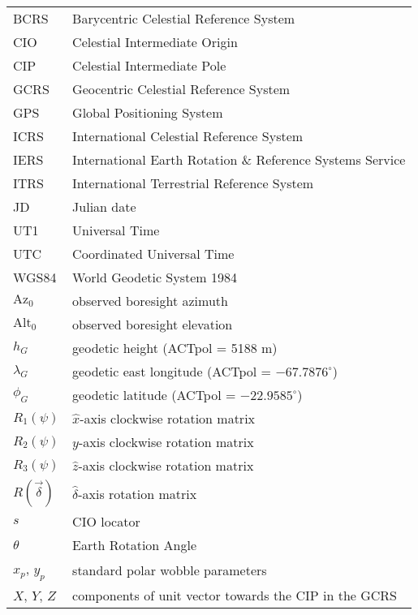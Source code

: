 \documentclass[10pt,preprint]{aastex}
\newcommand{\alt}{\mathrm{Alt}_0}
\newcommand{\az}{\mathrm{Az}_0}
\begin{document}
\begin{tabular}{ll}
BCRS & Barycentric Celestial Reference System \\
CIO & Celestial Intermediate Origin \\
CIP & Celestial Intermediate Pole \\
GCRS & Geocentric Celestial Reference System \\
GPS & Global Positioning System \\
ICRS & International Celestial Reference System \\
IERS & International Earth Rotation \& Reference Systems Service \\
ITRS & International Terrestrial Reference System \\
JD & Julian date \\
UT1 & Universal Time \\
UTC & Coordinated Universal Time \\
WGS84 & World Geodetic System 1984 \\
$\az$ & observed boresight azimuth \\
$\alt$ & observed boresight elevation \\
$h_G$ & geodetic height (ACTpol = 5188 m) \\
$\lambda_G$ & geodetic east longitude (ACTpol = $-67.7876^\circ$) \\
$\phi_G$ & geodetic latitude (ACTpol = $-22.9585^\circ$) \\
$R_1(\psi)$ & $\hat x$-axis clockwise rotation matrix \\
$R_2(\psi)$ & $\hat y$-axis clockwise rotation matrix \\
$R_3(\psi)$ & $\hat z$-axis clockwise rotation matrix \\
$R(\vec\delta)$ & $\hat\delta$-axis rotation matrix \\
$s$ & CIO locator \\
$\theta$ & Earth Rotation Angle \\
$x_p$, $y_p$ & standard polar wobble parameters \\
$X$, $Y$, $Z$ & components of unit vector towards the CIP in the GCRS
\end{tabular}
\end{document}

